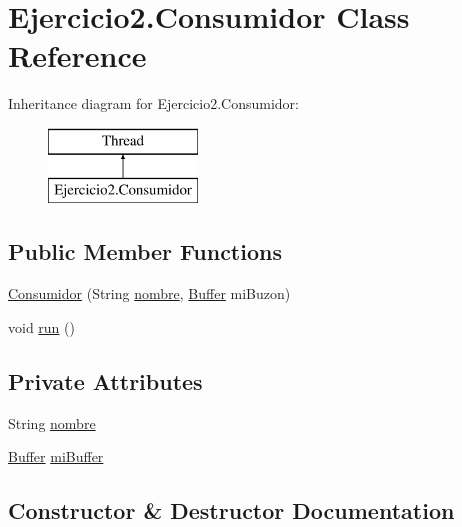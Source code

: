 \hypertarget{class_ejercicio2_1_1_consumidor}{}\section{Ejercicio2.\+Consumidor Class Reference}
\label{class_ejercicio2_1_1_consumidor}
Inheritance diagram for Ejercicio2.\+Consumidor\+:\begin{figure}[H]
\begin{center}
\leavevmode
\includegraphics[height=2.000000cm]{class_ejercicio2_1_1_consumidor}
\end{center}
\end{figure}
\subsection*{Public Member Functions}
\begin{DoxyCompactItemize}
\item 
\mbox{\hyperlink{class_ejercicio2_1_1_consumidor_a097982dbc6855d3a5b55053a94da4b61}{Consumidor}} (String \mbox{\hyperlink{class_ejercicio2_1_1_consumidor_a0efbf67d09a473327b9eeae309e95461}{nombre}}, \mbox{\hyperlink{class_ejercicio2_1_1_buffer}{Buffer}} mi\+Buzon)
\item 
void \mbox{\hyperlink{class_ejercicio2_1_1_consumidor_a934013ef29d768c3195cf3b63b16f903}{run}} ()
\end{DoxyCompactItemize}
\subsection*{Private Attributes}
\begin{DoxyCompactItemize}
\item 
String \mbox{\hyperlink{class_ejercicio2_1_1_consumidor_a0efbf67d09a473327b9eeae309e95461}{nombre}}
\item 
\mbox{\hyperlink{class_ejercicio2_1_1_buffer}{Buffer}} \mbox{\hyperlink{class_ejercicio2_1_1_consumidor_a01ad7eb71084d12b87a1d14ffdcddfb5}{mi\+Buffer}}
\end{DoxyCompactItemize}


\subsection{Constructor \& Destructor Documentation}
\mbox{\label{class_ejercicio2_1_1_consumidor_a097982dbc6855d3a5b55053a94da4b61}} 
